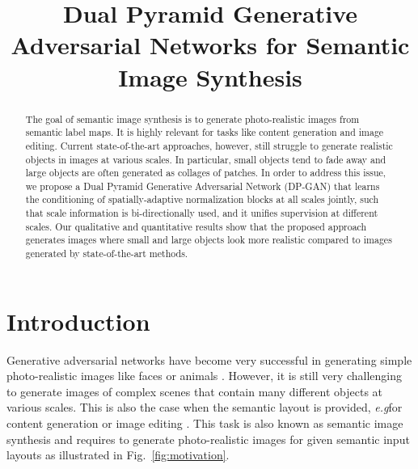 \documentclass{bmvc2k}
\title{Dual Pyramid Generative Adversarial Networks for Semantic Image Synthesis}
\newcommand{\figref}[1]{Fig.~\ref{#1}}
\def\eg{\emph{e.g}\bmvaOneDot}
\begin{document}
\maketitle

\begin{abstract}

The goal of semantic image synthesis is to generate photo-realistic images from semantic label maps. It is highly relevant for tasks like content generation and image editing. Current state-of-the-art approaches, however, still struggle to generate realistic objects in images at various scales. In particular, small objects tend to fade away and large objects are often generated as collages of patches. In order to address this issue, we propose a Dual Pyramid Generative Adversarial Network (DP-GAN) that learns the conditioning of spatially-adaptive normalization blocks at all scales jointly, such that scale information is bi-directionally used, and it unifies supervision at different scales. Our qualitative and quantitative results show that the proposed approach generates images where small and large objects look more realistic compared to images generated by state-of-the-art methods. 
\end{abstract}




\section{Introduction}







Generative adversarial networks \cite{goodfellow2014generative} have become very successful in generating simple photo-realistic images like faces or animals \cite{karras2018progressive,karras2019style,brock2018large}.
However, it is still very challenging to generate images of complex scenes that contain many different objects at various scales. This is also the case when the semantic layout is provided, \eg for content generation or image editing \cite{isola2017image,chen2017photographic,wang2018high}. This task is also known as semantic image synthesis and requires to generate photo-realistic images for given semantic input layouts as illustrated in \figref{fig:motivation}.  
\end{document}
